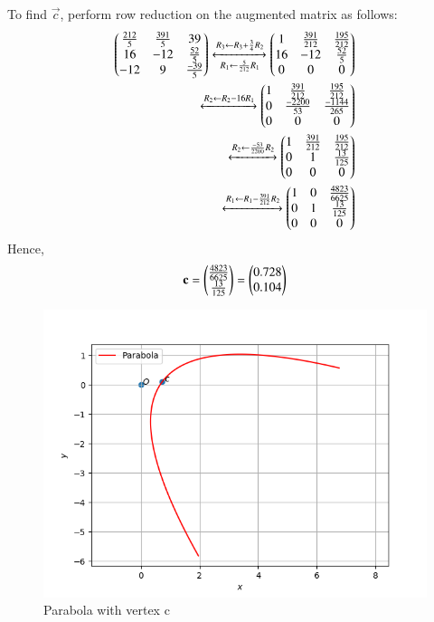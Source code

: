 To find $\vec{c}$, perform row reduction on the augmented matrix as follows:
\begin{align}
    \begin{pmatrix}\frac{212}{5} & \frac{391}{5} & 39\\16 & -12 & \frac{52}{5}\\-12 & 9 & \frac{-39}{5}\end{pmatrix}\xleftrightarrow[R_1\leftarrow \frac{5}{212}R_1]{R_3\leftarrow R_3+\frac{3}{4}R_2}\begin{pmatrix}1 & \frac{391}{212} & \frac{195}{212}\\16 & -12 & \frac{52}{5}\\0&0&0\end{pmatrix}\\
    \xleftrightarrow{R_2\leftarrow R_2-16R_1}\begin{pmatrix} 1 & \frac{391}{212} & \frac{195}{212}\\0 & \frac{-2200}{53} & \frac{-1144}{265} \\0&0&0\end{pmatrix}\\\xleftrightarrow{R_2\leftarrow \frac{-53}{2200}R_2}\begin{pmatrix}1 & \frac{391}{212} & \frac{195}{212} \\0 & 1 & \frac{13}{125}\\0&0&0\end{pmatrix}\\\xleftrightarrow{R_1\leftarrow R_1-\frac{391}{212}R_2}\begin{pmatrix}1 & 0 & \frac{4823}{6625}\\0 & 1 & \frac{13}{125}\\0&0&0\end{pmatrix}
\end{align}
Hence,
\begin{align}
\mathbf{c}=\begin{pmatrix}\frac{4823}{6625}\\ \frac{13}{125}\end{pmatrix}= \begin{pmatrix}0.728 \\ 0.104\end{pmatrix}
\end{align}
\begin{figure}[h!]
	\centering
	\includegraphics[width=\columnwidth]{./solutions/41/8/Codes/A5.png}
	\caption{Parabola with vertex c }
	\label{eq:solutions/41/8/myfig}
\end{figure}
